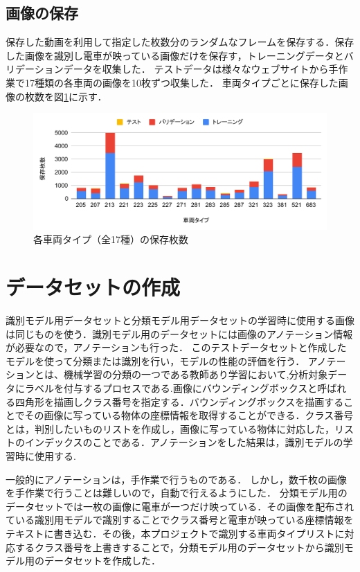 \subsection{画像の保存}
保存した動画を利用して指定した枚数分のランダムなフレームを保存する．保存した画像を識別し電車が映っている画像だけを保存す，トレーニングデータとバリデーションデータを収集した．
テストデータは様々なウェブサイトから手作業で17種類の各車両の画像を10枚ずつ収集した．
車両タイプごとに保存した画像の枚数を図\ref{fig:chart}に示す．


\begin{figure}[H]
	\centering
	\includegraphics[width=\linewidth]{chap3/fig/chart2}
	\caption{各車両タイプ（全17種）の保存枚数}
	\label{fig:chart}
\end{figure}



\section{データセットの作成}

識別モデル用データセットと分類モデル用データセットの学習時に使用する画像は同じものを使う．識別モデル用のデータセットには画像のアノテーション情報が必要なので，アノテーションも行った．
このテストデータセットと作成したモデルを使って分類または識別を行い，モデルの性能の評価を行う．
アノテーションとは、機械学習の分類の一つである教師あり学習において,分析対象データにラベルを付与するプロセスである.画像にバウンディングボックスと呼ばれる四角形を描画しクラス番号を指定する．バウンディングボックスを描画することでその画像に写っている物体の座標情報を取得することができる．クラス番号とは，判別したいものリストを作成し，画像に写っている物体に対応した，リストのインデックスのことである．アノテーションをした結果は，識別モデルの学習時に使用する.

一般的にアノテーションは，手作業で行うものである．
しかし，数千枚の画像を手作業で行うことは難しいので，自動で行えるようにした．
分類モデル用のデータセットでは一枚の画像に電車が一つだけ映っている．その画像を配布されている識別用モデルで識別することでクラス番号と電車が映っている座標情報をテキストに書き込む．その後，本プロジェクトで識別する車両タイプリストに対応するクラス番号を上書きすることで，分類モデル用のデータセットから識別モデル用のデータセットを作成した．


